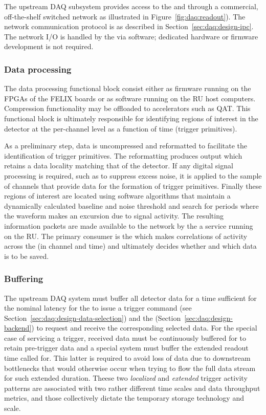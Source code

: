 The upstream DAQ subsystem provides access to the  and  through a commercial, off-the-shelf switched network as illustrated in Figure~\ref{fig:daq:readout}).
The network communication protocol is as described in Section~\ref{sec:daq:design-ipc}.
The network I/O is handled by the  via software; dedicated hardware or firmware development is not required.

\subsubsection{Data processing}
\label{sec:daq:upstream-proc}

The data processing functional block consist either as firmware running on the
FPGAs of the FELIX boards or as software running on the RU host computers.
Compression functionality may be offloaded to accelerators such as QAT.
This functional block is ultimately responsible for identifying regions of
interest in the detector at the per-channel level as a function of time (trigger
primitives).

As a preliminary step, data is uncompressed and reformatted to facilitate the
identification of trigger primitives.
The reformatting produces output which retains a data locality matching that of
the detector.
If any digital signal processing is required, such as to suppress excess noise,
it is applied to the sample of channels that provide data for the formation of
trigger primitives.
Finally these regions of interest are located using software algorithms that
maintain a dynamically calculated baseline and noise threshold and search for
periods where the waveform makes an excursion due to signal activity. 
The resulting  information packets are made available to
the network by the a service running on the RU.
The primary consumer is the  which makes correlations of activity
across the  (in channel and time) and ultimately decides
whether and which data is to be saved.


\subsubsection{Buffering}
\label{sec:daq:upstream-buf}

The upstream DAQ system must buffer all detector data for a time sufficient for
the nominal latency for the  to issue a trigger command (see
Section~\ref{sec:daq:design-data-selection}) and the 
(Section~\ref{sec:daq:design-backend}) to request and receive the corresponding
selected data. 
For the special case of servicing a  trigger, received data must be
continuously buffered for to retain pre-trigger data and a special system must
buffer the extended readout time called for. 
This latter is required to avoid loss of data due to downstream bottlenecks that
would otherwise occur when trying to flow the full data stream for such extended
duration.
Theese two \textit{localized} and \textit{extended} trigger activity patterns
are associated with two rather different time scales and data throughput
metrics, and those collectively dictate the temporary storage technology and
scale. 

